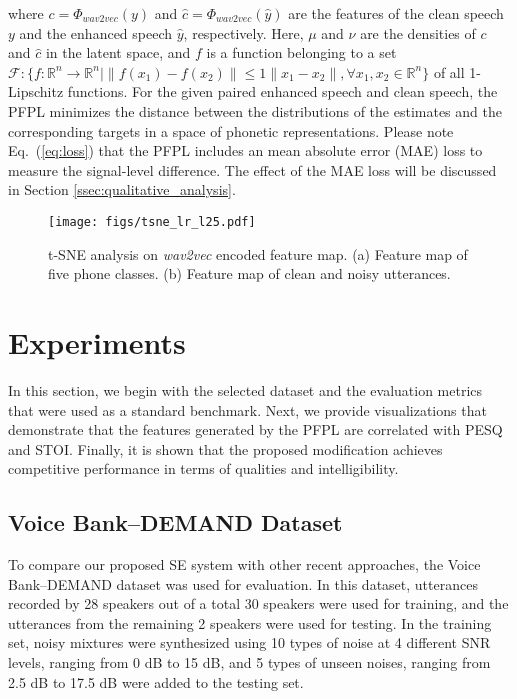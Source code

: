 \documentclass[a4paper]{article}
\begin{document}
where $c=\Phi_{\textit{wav2vec}}(y)$ and $\hat{c}=\Phi_{\textit{wav2vec}}(\hat{y})$ are the features of the clean speech $y$ and the enhanced speech $\hat{y}$, respectively. Here, $\mu$ and $\nu$ are the densities of $c$ and $\hat{c}$ in the latent space, and $f$ is a function belonging to a set $\mathcal{F}: \{ f: \mathbb{R}^n \to \mathbb{R}^n | \|f(x_1) - f(x_2) \| \leq 1\|x_1 - x_2\|, \forall x_1 , x_2 \in \mathbb{R}^n \}$ of all 1-Lipschitz functions. For the given paired enhanced speech and clean speech, the PFPL minimizes the distance between the distributions of the estimates and the corresponding targets in a space of phonetic representations. Please note Eq.~(\ref{eq:loss}) that the PFPL includes an mean absolute error (MAE) loss to measure the signal-level difference. The effect of the MAE loss will be discussed in Section \ref{ssec:qualitative_analysis}. 
\begin{figure}[ht]
\texttt{[image: figs/tsne\_lr\_l25.pdf]}
    \centering 
\caption{t-SNE analysis on \textit{wav2vec} encoded feature map. (a) Feature map of five phone classes. (b) Feature map of clean and noisy utterances.}
    \label{fig:tsne}
\end{figure}
\section{Experiments}
\label{sec:experiments}

In this section, we begin with the selected dataset and the evaluation metrics that were used as a standard benchmark. Next, we provide visualizations that demonstrate that the features generated by the PFPL are correlated with PESQ and STOI. Finally, it is shown that the proposed modification achieves competitive performance in terms of qualities and intelligibility.



\subsection{Voice Bank--DEMAND Dataset}
\label{ssec:voice_bank_demand_dataset}
To compare our proposed SE system with other recent approaches, the Voice Bank--DEMAND dataset \cite{voicebank, demand} was used for evaluation. In this dataset, utterances recorded by 28 speakers out of a total 30 speakers were used for training, and the utterances from the remaining 2 speakers were used for testing. In the training set, noisy mixtures were synthesized using 10 types of noise at 4 different SNR levels, ranging from 0 dB to 15 dB, and 5 types of unseen noises, ranging from 2.5 dB to 17.5 dB were added to the testing set.
\end{document}
